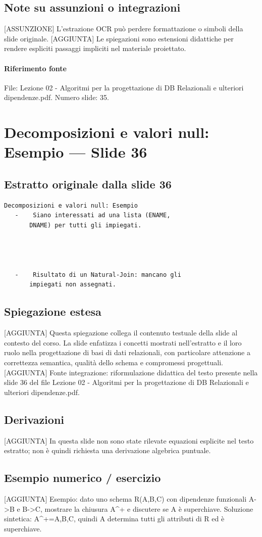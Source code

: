 \documentclass[11pt]{article}
\begin{document}
\subsection*{Note su assunzioni o integrazioni}
[ASSUNZIONE] L'estrazione OCR può perdere formattazione o simboli della slide originale.
[AGGIUNTA] Le spiegazioni sono estensioni didattiche per rendere espliciti passaggi impliciti nel materiale proiettato.
\paragraph{Riferimento fonte} File: Lezione 02 - Algoritmi per la progettazione di DB Relazionali e ulteriori dipendenze.pdf. Numero slide: 35.
\section{Decomposizioni e valori null: Esempio --- Slide 36}
\subsection*{Estratto originale dalla slide 36}
\begin{lstlisting}
Decomposizioni e valori null: Esempio
   -    Siano interessati ad una lista (ENAME,
       DNAME) per tutti gli impiegati.




   -    Risultato di un Natural-Join: mancano gli
       impiegati non assegnati.
\end{lstlisting}
\subsection*{Spiegazione estesa}
[AGGIUNTA] Questa spiegazione collega il contenuto testuale della slide al contesto del corso. La slide enfatizza i concetti mostrati nell'estratto e il loro ruolo nella progettazione di basi di dati relazionali, con particolare attenzione a correttezza semantica, qualità dello schema e compromessi progettuali.
[AGGIUNTA] Fonte integrazione: riformulazione didattica del testo presente nella slide 36 del file Lezione 02 - Algoritmi per la progettazione di DB Relazionali e ulteriori dipendenze.pdf.
\subsection*{Derivazioni}
[AGGIUNTA] In questa slide non sono state rilevate equazioni esplicite nel testo estratto; non è quindi richiesta una derivazione algebrica puntuale.
\subsection*{Esempio numerico / esercizio}
[AGGIUNTA] Esempio: dato uno schema R(A,B,C) con dipendenze funzionali A->B e B->C, mostrare la chiusura A^+ e discutere se A è superchiave. Soluzione sintetica: A^+={A,B,C}, quindi A determina tutti gli attributi di R ed è superchiave.
\end{document}
